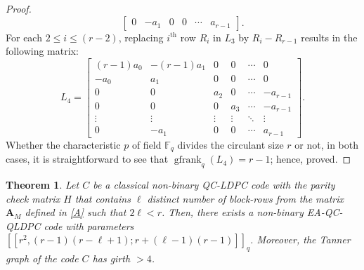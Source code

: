 \documentclass[conference]{IEEEtran}
\newtheorem{theorem}{Theorem}
\begin{document}
\begin{proof}
\begin{equation*}
\begin{bmatrix}
0 & -a_{1} & 0 & 0 & \cdots & a_{r-1}
\end{bmatrix}.
\end{equation*}
For each $2\leq i\leq (r-2)$, replacing $i^{\text{th}}$  row $R_{i}$ in $L_{3}$  by $R_{i}-R_{r-1}$ results in the following matrix:
\begin{equation*}
L_{4} =
\begin{bmatrix}
(r-1)a_{0} & -(r-1)a_{1} & 0 & 0 & \cdots & 0 \\
-a_{0} & a_{1} & 0 & 0 & \cdots & 0 \\
0 & 0 & a_{2} & 0 & \cdots & -a_{r-1}\\
0 & 0 & 0 & a_{3} & \cdots & -a_{r-1} \\
\vdots & \vdots & \vdots & \vdots & \ddots & \vdots \\
0 & -a_{1}& 0 & 0 & \cdots & a_{r-1}
\end{bmatrix}.
\end{equation*}
Whether the characteristic $p$ of field $\mathbb{F}_{q}$ divides the circulant size $r$ or not, in both cases, it is straightforward to see that $\operatorname{gfrank}_{q}(L_{4}) = r - 1$; hence, proved.
\end{proof}
\begin{theorem}\label{theorem4}
Let $C$ be a classical non-binary QC-LDPC code with the parity check matrix $H$ that contains $\ell$ distinct number of block-rows from the matrix $\mathbf{A}_{M}$ defined in \eqref{A} such that $2\ell<r$. Then, there exists a non-binary EA-QC-QLDPC code with parameters $[[r^{2},(r-1)(r-\ell+1);r+(\ell-1)(r-1)]]_q$. Moreover, the Tanner graph of the code $C$ has girth $> 4$.    
\end{theorem}
\end{document}
